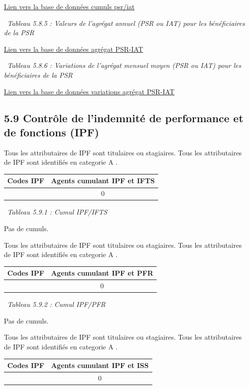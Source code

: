 \href{../Bases/Reglementation/personnels.psr.iat.csv}{Lien vers la base de
données cumuls psr/iat}

~\emph{Tableau 5.8.5 : Valeurs de l'agrégat annuel (PSR ou IAT) pour les
bénéficiaires de la PSR}

\href{../Bases/Remunerations/beneficiaires.PSR.IAT.csv}{Lien vers la base
de données agrégat PSR-IAT}

~\emph{Tableau 5.8.6 : Variations de l'agrégat mensuel moyen (PSR ou
IAT) pour les bénéficiaires de la PSR}

\href{../Bases/Remunerations/beneficiaires.PSR.IAT.Variation.csv}{Lien vers
la base de données variations agrégat PSR-IAT}

\hypertarget{controle-de-lindemnite-de-performance-et-de-fonctions-ipf}{%
\subsection{5.9 Contrôle de l'indemnité de performance et de fonctions
(IPF)}\label{controle-de-lindemnite-de-performance-et-de-fonctions-ipf}}

Tous les attributaires de IPF sont titulaires ou stagiaires. Tous les
attributaires de IPF sont identifiés en categorie A .

\begin{longtable}[]{@{}cc@{}}
\toprule
Codes IPF & Agents cumulant IPF et IFTS\tabularnewline
\midrule
\endhead
& 0\tabularnewline
\bottomrule
\end{longtable}

~\emph{Tableau 5.9.1 : Cumul IPF/IFTS}

Pas de cumuls.

Tous les attributaires de IPF sont titulaires ou stagiaires. Tous les
attributaires de IPF sont identifiés en categorie A .

\begin{longtable}[]{@{}cc@{}}
\toprule
Codes IPF & Agents cumulant IPF et PFR\tabularnewline
\midrule
\endhead
& 0\tabularnewline
\bottomrule
\end{longtable}

~\emph{Tableau 5.9.2 : Cumul IPF/PFR}

Pas de cumuls.

Tous les attributaires de IPF sont titulaires ou stagiaires. Tous les
attributaires de IPF sont identifiés en categorie A .

\begin{longtable}[]{@{}cc@{}}
\toprule
Codes IPF & Agents cumulant IPF et ISS\tabularnewline
\midrule
\endhead
& 0\tabularnewline
\bottomrule
\end{longtable}

